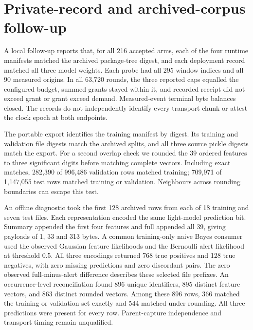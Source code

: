 \documentclass[10pt,onecolumn]{IEEEtran}
\begin{document}
\section{Private-record and archived-corpus follow-up}
\label{sec:private_followup}
A local follow-up reports that, for all 216 accepted arms, each of the four runtime manifests matched the
archived package-tree digest, and each deployment record matched all three
model weights. Each probe had all 295 window indices and all 90 measured
origins. In all 63,720 rounds, the three reported caps equalled the configured
budget, summed grants stayed within it, and recorded receipt did not exceed
grant or grant exceed demand. Measured-event terminal byte balances closed.
The records do not independently identify every transport chunk or attest
the clock epoch at both endpoints.

The portable export identifies the training manifest by digest. Its training
and validation file digests match the archived splits, and all three source
pickle digests match the export. For a second overlap check we rounded the 39
ordered features to three significant digits before matching complete vectors.
Including exact matches, 282,390 of 996,486 validation rows matched training;
709,971 of 1,147,055 test rows matched training or validation. Neighbours
across rounding boundaries can escape this test.

An offline diagnostic took the first 128 archived rows from each of 18
training and seven test files. Each representation encoded the same
light-model prediction bit. Summary appended the first four features and
full appended all 39, giving payloads of 1, 33 and 313 bytes. A common
training-only naive Bayes consumer used the observed Gaussian feature
likelihoods and the Bernoulli alert likelihood at threshold 0.5.
All three encodings returned 768 true positives and 128 true negatives,
with zero missing predictions and zero discordant pairs. The zero observed
full-minus-alert difference describes these selected file prefixes.
An occurrence-level reconciliation found 896 unique identifiers, 895
distinct feature vectors, and 863 distinct rounded vectors. Among these
896 rows, 366 matched the training or validation set exactly and 544
matched under rounding. All three predictions were present for every row.
Parent-capture independence and transport timing remain unqualified.
\end{document}
